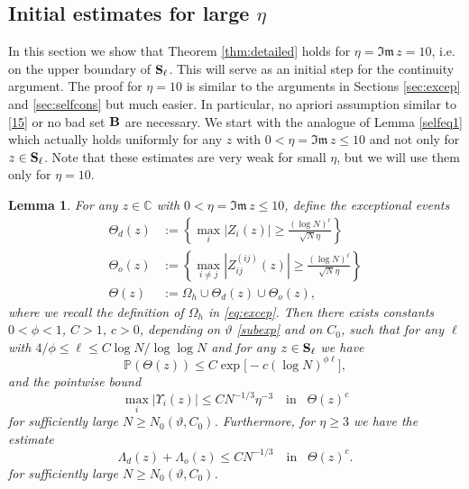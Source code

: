 \documentclass[draft]{article}
\newcommand{\ttau}{\vartheta}
\newcommand{\bC}{{\mathbb C}}
\newcommand{\non}{\nonumber}
\newcommand{\be}{\begin{equation}}
\newcommand{\ee}{\end{equation}}
\newcommand{\im}{{\mathfrak{Im} \, }}
\renewcommand{\P}{{\mathbb P}}
\newcommand{\bS}{ {\bf  S}}
\newtheorem{lemma}[theorem]{Lemma}
\newcommand{\qed}{\hfill\fbox{}\par\vspace{0.3mm}}
\numberwithin{equation}{section}
\numberwithin{theorem}{section}
\numberwithin{definition}{section}
\numberwithin{remark}{section}
\begin{document}
\qed 

 
\subsection{Initial estimates for large $\eta$}


In this section we show that Theorem \ref{thm:detailed}
holds for $\eta=\im z = 10$, i.e. on the upper boundary of
$\bS_\ell$. This will serve as an initial step for the
continuity argument. The proof for $\eta=10$ is similar
to the arguments in Sections \ref{sec:excep} and \ref{sec:selfcons}
but much easier. In particular, no apriori
assumption similar to  \eqref{15} or no bad set ${\bf B}$
are  necessary.
We start with the analogue of Lemma \ref{selfeq1} which actually holds
uniformly for any $z$ with $0< \eta=\im z\le 10$
 and not only for $z\in \bS_\ell$.  Note that these estimates
are very weak for small $\eta$, but we will use 
them only for $\eta=10$.



\begin{lemma}\label{selfeq1-1} 
For any $z\in \bC$ with $0< \eta=\im z\le 10$, define  the exceptional events 
\begin{align} 
\Theta_d(z) &:= \left \{   \max_{i}|Z_i(z)|\ge  \frac {(\log N)^\ell  } {\sqrt{N} \eta} \right \} 
 \non \\
 \Theta_o(z) &:= \left \{    \max_{i\ne j}|Z_{ij}^{(ij)}(z)| 
\ge\frac {(\log N)^\ell }  {\sqrt{N} \eta} \right \} \non  \\
   \Theta (z) &:= 
 \Omega_h \cup \Theta_d(z) \cup \Theta_o(z), 
\label{defTheta}
\end{align}
where we recall the definition of $\Omega_h$ in \eqref{eq:excep}.
Then   there exists constants $0<\phi < 1$, $C>1$, $c>0$,  depending on 
$\ttau$ \eqref{subexp} and on $C_0$,
such that  for any $\ell$ with $4/\phi \le \ell \le  C \log N/\log \log N $
 and for any $z\in {\bf S}_\ell $  we have 
\be\label{B12-1}
\P (  \Theta (z)  )    \le C\exp{\big[-c(\log N)^{\phi \ell } \big]},
\ee
and the pointwise bound 
\be\label{21-1}
\max_i  |\Upsilon_i(z)|
 \le CN^{-1/3}  \eta^{-3}    \quad \text {in}  \;\;\;   \Theta(z) ^c
\ee
for sufficiently large $N\ge N_0(\ttau, C_0)$. 
Furthermore, for $\eta \ge 3$ we have the estimate 
\be\label{12-3}
\Lambda_d(z) +\Lambda_o(z)\le CN^{-1/3}  \quad \text {in}  \;\;\;   \Theta(z) ^c.
\ee
for sufficiently large $N\ge N_0(\ttau, C_0)$.
\end{lemma}
  
\end{document}
